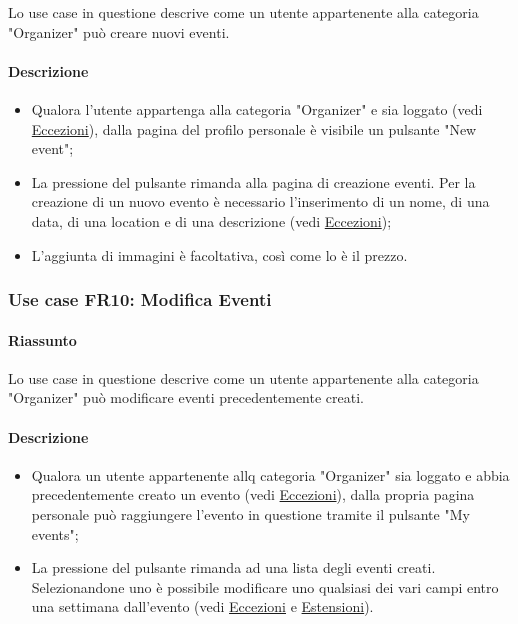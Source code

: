 \documentclass[9pt]{extarticle}
\begin{document}
Lo use case in questione descrive come un utente appartenente alla categoria "Organizer" può creare nuovi eventi.

\newpage

\paragraph{Descrizione}

\begin{itemize}
	\item Qualora l'utente appartenga alla categoria "Organizer" e sia loggato (vedi \hyperref[Eccezioni-FR8-10]{Eccezioni}), dalla pagina del profilo personale è visibile un pulsante "New event";
	\item La pressione del pulsante rimanda alla pagina di creazione eventi. Per la creazione di un nuovo evento è necessario l'inserimento di un nome, di una data, di una location e di una descrizione (vedi \hyperref[Eccezioni-FR8-10]{Eccezioni});
	\item L'aggiunta di immagini è facoltativa, così come lo è il prezzo.
\end{itemize}

\subsubsection*{Use case FR10: Modifica Eventi}

\paragraph{Riassunto}

Lo use case in questione descrive come un utente appartenente alla categoria "Organizer" può modificare eventi precedentemente creati.

\paragraph{Descrizione}
\begin{itemize}
	\item Qualora un utente appartenente allq categoria "Organizer" sia loggato e abbia precedentemente creato un evento (vedi \hyperref[Eccezioni-FR8-10]{Eccezioni}), dalla propria pagina personale può raggiungere l'evento in questione tramite il pulsante "My events";
	\item La pressione del pulsante rimanda ad una lista degli eventi creati. Selezionandone uno è possibile modificare uno qualsiasi dei vari campi entro una settimana dall'evento (vedi \hyperref[Eccezioni-FR8-10]{Eccezioni} e \hyperref[Estensioni-FR8-10]{Estensioni}).
\end{itemize}
\end{document}
